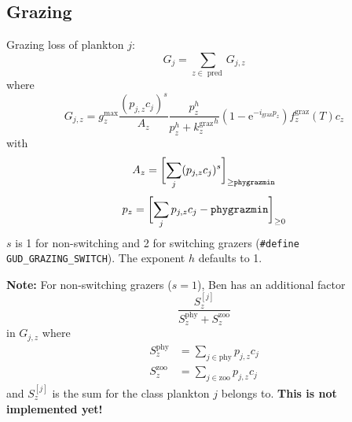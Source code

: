 \documentclass[11pt,letterpaper,english]{article}
\def\|#1|{\operatorname{#1}}
\newcommand{\ee}{\mathrm{e}}
\newcommand{\graz}{{\text{graz}}}
\newcommand{\phy}{{\text{phy}}}
\newcommand{\zoo}{{\text{zoo}}}
\newcommand{\X}{c}
\newcommand{\palat}{p}
\begin{document}
\subsection{Grazing}

Grazing loss of plankton $j$:
\[
  G_j = \sum_{z\in\|pred|} G_{j,z}
\]
where
\[
  G_{j,z} = g^{\max}_z
       \frac{(\palat_{j,z} \X_j)^s}{A_z}
       \frac{p_z^h}{p_z^h + {k^\graz_z}^h}
       (1 - \ee^{-i_\graz p_z})
       f^\graz_z(T)
       \X_z
\]
with
\[
  A_z = \biggl[ \sum_j (\palat_{j,z} \X_j)^s \biggr]_{\ge\tt phygrazmin}
\]
\[
  p_z = \biggl[ \sum_j \palat_{j,z} \X_j - {\tt phygrazmin} \biggr]_{\ge 0}
\]
$s$ is 1 for non-switching and 2 for switching grazers (\verb|#define GUD_GRAZING_SWITCH|).
The exponent $h$ defaults to 1.

\textbf{Note:} For non-switching grazers ($s=1$), Ben has an additional factor
\[
  \frac{S^{[j]}_z}{S^\phy_z + S^\zoo_z}
\]
in $G_{j,z}$ where
\begin{align*}
  S^\phy_z &= \sum_{j\in\phy} \palat_{j,z} \X_j
\\
  S^\zoo_z &= \sum_{j\in\zoo} \palat_{j,z} \X_j
\end{align*}
and $S^{[j]}_z$ is the sum for the class plankton $j$ belongs to.
\textbf{This is not implemented yet!}
\end{document}
